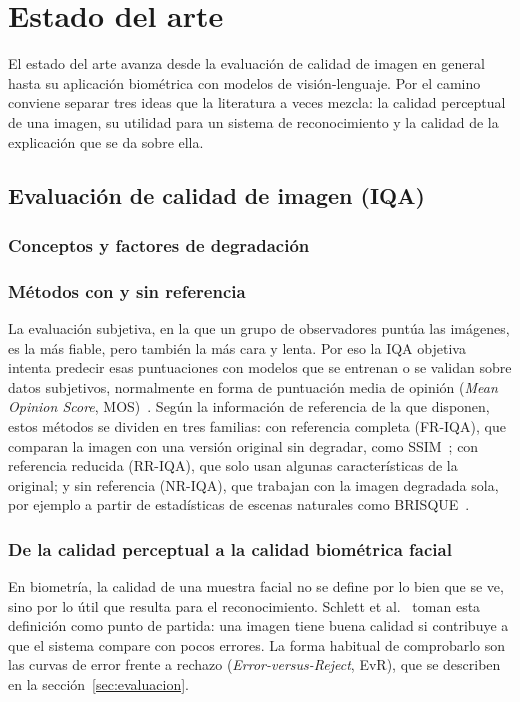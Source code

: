 \section{Estado del arte}
\label{sec:arte}
El estado del arte avanza desde la evaluación de calidad de imagen en general hasta su aplicación biométrica con modelos de visión-lenguaje. Por el camino conviene separar tres ideas que la literatura a veces mezcla: la calidad perceptual de una imagen, su utilidad para un sistema de reconocimiento y la calidad de la explicación que se da sobre ella.

\subsection{Evaluación de calidad de imagen (IQA)}
\label{sec:iqa}
\subsubsection{Conceptos y factores de degradación}

\subsubsection{Métodos con y sin referencia}
La evaluación subjetiva, en la que un grupo de observadores puntúa las imágenes, es la más fiable, pero también la más cara y lenta. Por eso la IQA objetiva intenta predecir esas puntuaciones con modelos que se entrenan o se validan sobre datos subjetivos, normalmente en forma de puntuación media de opinión (\textit{Mean Opinion Score}, MOS)~\cite{Zhang_2025_TOMM}. Según la información de referencia de la que disponen, estos métodos se dividen en tres familias: con referencia completa (FR-IQA), que comparan la imagen con una versión original sin degradar, como SSIM~\cite{Wang_2004_TIP}; con referencia reducida (RR-IQA), que solo usan algunas características de la original; y sin referencia (NR-IQA), que trabajan con la imagen degradada sola, por ejemplo a partir de estadísticas de escenas naturales como BRISQUE~\cite{Mittal_2012_TIP}.

\subsubsection{De la calidad perceptual a la calidad biométrica facial}
\label{sec:perceptual-biometrica}
En biometría, la calidad de una muestra facial no se define por lo bien que se ve, sino por lo útil que resulta para el reconocimiento. Schlett et al.~\cite{Schlett_2022_CSUR} toman esta definición como punto de partida: una imagen tiene buena calidad si contribuye a que el sistema compare con pocos errores. La forma habitual de comprobarlo son las curvas de error frente a rechazo (\textit{Error-versus-Reject}, EvR), que se describen en la sección~\ref{sec:evaluacion}.

